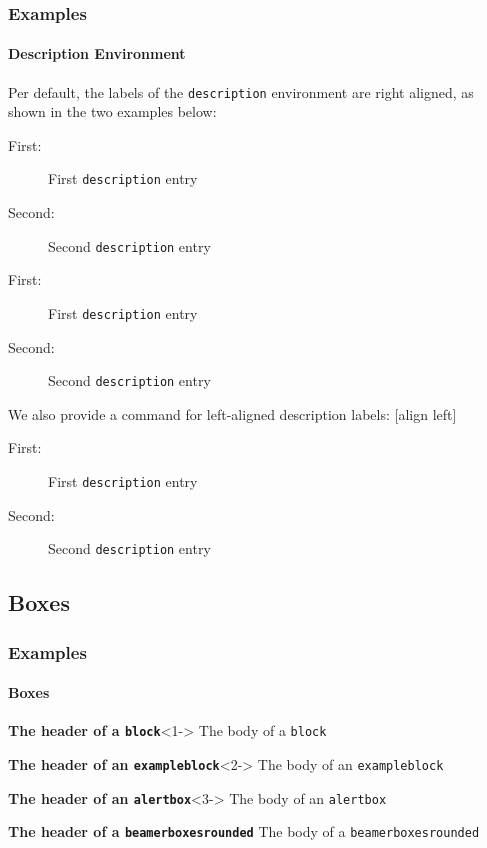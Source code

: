 \documentclass{beamer}
\begin{document}
\begin{frame}
\frametitle{Examples}
\framesubtitle{Description Environment}
  \vfill
  Per default, the labels of the \texttt{description} environment are
  right aligned, as shown in the two examples below:
  \begin{description}
  \item[First:] First \texttt{description} entry
  \item[Second:] Second \texttt{description} entry
  \end{description}
  \begin{description}
  \item[First:] First \texttt{description} entry
  \item[Second:] Second \texttt{description} entry
  \end{description}
  \vfill
  \vfill
  We also provide a command for left-aligned description labels:
  [align left]
  \begin{description}
  \item[First:] First \texttt{description} entry
  \item[Second:] Second \texttt{description} entry
  \end{description}
  \vfill
\end{frame}

\subsection{Boxes}

\begin{frame}
  \frametitle{Examples}
  \framesubtitle{Boxes}
  \vfill
  \begin{block}{\textbf{The header of a \texttt{block}}}<1->
    The body of a \texttt{block}
  \end{block}
  \vfill
  \begin{exampleblock}{\textbf{The header of an \texttt{exampleblock}}}<2->
    The body of an \texttt{exampleblock}
  \end{exampleblock}
  \vfill
  \begin{alertblock}{\textbf{The header of an \texttt{alertbox}}}<3->
    The body of an \texttt{alertbox}
  \end{alertblock}
  \vfill
  \begin{beamerboxesrounded}[width=\linewidth,shadow=true]{\textbf{The header of a \texttt{beamerboxesrounded}}}
    The body of a \texttt{beamerboxesrounded}
  \end{beamerboxesrounded}
  \vfill
\end{frame}
\end{document}
